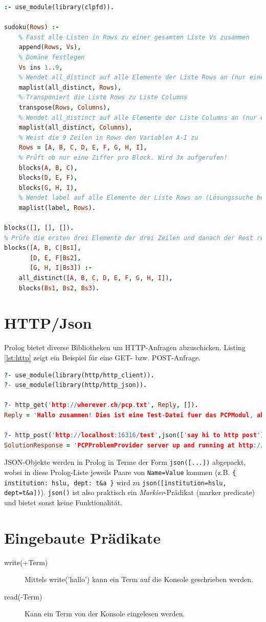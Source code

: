 \begin{lstlisting}[language=Prolog, caption=Sudoku, label=lst:sudoku]
:- use_module(library(clpfd)).

sudoku(Rows) :-
	% Fasst alle Listen in Rows zu einer gesamten Liste Vs zusammen
	append(Rows, Vs), 
	% Domäne festlegen
	Vs ins 1..9,
	% Wendet all_distinct auf alle Elemente der Liste Rows an (nur eine Ziffer pro Zeile)
	maplist(all_distinct, Rows),
	% Transponiert die Liste Rows zu Liste Columns
	transpose(Rows, Columns),
	% Wendet all_distinct auf alle Elemente der Liste Columns an (nur eine Ziffer pro Spalte)
	maplist(all_distinct, Columns),
	% Weist die 9 Zeilen in Rows den Variablen A-I zu
	Rows = [A, B, C, D, E, F, G, H, I],
	% Prüft ob nur eine Ziffer pro Block. Wird 3x aufgerufen!
	blocks(A, B, C), 
	blocks(D, E, F), 
	blocks(G, H, I),
	% Wendet label auf alle Elemente der Liste Rows an (Lösungssuche beginnt)
	maplist(label, Rows).

blocks([], [], []).
% Prüfe die ersten drei Elemente der drei Zeilen und danach der Rest rekursiv
blocks([A, B, C|Bs1], 
	   [D, E, F|Bs2], 
	   [G, H, I|Bs3]) :-
	all_distinct([A, B, C, D, E, F, G, H, I]),
	blocks(Bs1, Bs2, Bs3).
\end{lstlisting}

\section{HTTP/Json}

Prolog bietet diverse Bibliotheken um HTTP-Anfragen abzuschicken. Listing \ref{lst:http} zeigt ein Beispiel für eine GET- bzw. POST-Anfrage.
 
\begin{lstlisting}[language=Prolog, caption=HTTP, label=lst:http]
?- use_module(library(http/http_client)).
?- use_module(library(http/http_json)).

?- http_get('http://wherever.ch/pcp.txt', Reply, []).
Reply = 'Hallo zusammen! Dies ist eine Test-Datei fuer das PCPModul, abgelegt unter http://wherever.ch/pcp.txt. - Prolog rockt! :-) MfG, Ruedi Arnold'.

?- http_post('http://localhost:16316/test',json(['say hi to http post']), SolutionResponse, []).
SolutionResponse = 'PCPProblemProvider server up and running at http://localhost:16316/, reached via HTTP POST - POSTed data: ["say hi to http post" ]'.
\end{lstlisting}

JSON-Objekte werden in Prolog in Terme der Form \verb|json([...])| abgepackt, wobei in diese Prolog-Liste jeweils Paare von \verb|Name=Value| kommen (z.B. \verb|{ institution: hslu, dept: t&a }| wird zu \verb|json([institution=hslu, dept=t&a])|).
\verb|json()| ist also praktisch ein \textit{Markier}-Prädikat (marker predicate) und bietet sonst keine Funktionalität.

\section{Eingebaute Prädikate}

\begin{description}
	\item[write(+Term)] Mittels write('hallo') kann ein Term auf die Konsole geschrieben werden.
	\item[read(-Term)] Kann ein Term von der Konsole eingelesen werden.
\end{description}